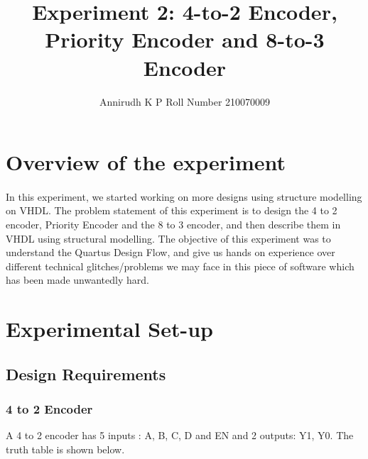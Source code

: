 \documentclass[12pt]{article}
\title{Experiment 2: 4-to-2 Encoder, Priority Encoder and 8-to-3 Encoder}
\author{Annirudh K P Roll Number 210070009}
\begin{document}
\maketitle

\section{Overview of the experiment}
\paragraph{}
In this experiment, we started working on more designs using structure modelling on VHDL. The problem statement of this experiment is to design the 4 to 2 encoder, Priority Encoder and the 8 to 3 encoder, and then describe them in VHDL using structural modelling. The objective of this experiment was to understand the Quartus Design Flow, and give us hands on experience over different technical glitches/problems we may face in this piece of software which has been made unwantedly hard.

\section{Experimental Set-up}

\subsection{Design Requirements}
\subsubsection{4 to 2 Encoder}
A 4 to 2 encoder has 5 inputs : A, B, C, D and EN and 2 outputs: Y1, Y0. The truth table is shown below.
\end{document}
